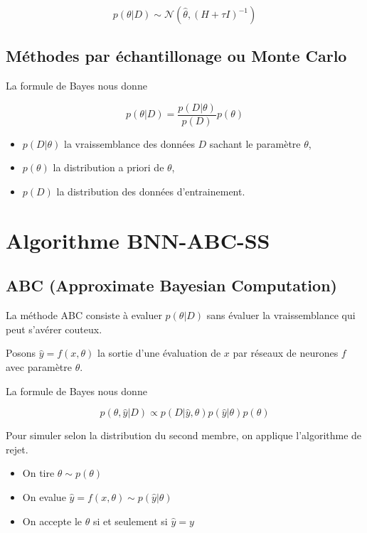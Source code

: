 \documentclass[french,12pt]{article}
\begin{document}
$$p(\theta | D) \sim \mathcal{N}(\hat{\theta}, (H + \tau I)^{-1})$$

\subsection{Méthodes par échantillonage ou Monte Carlo}

La formule de Bayes nous donne

$$p(\theta | D) = \frac{p(D | \theta) }{p(D)}p(\theta)$$

\begin{itemize}
    \item $p(D | \theta)$ la vraissemblance des données $D$ sachant le paramètre $\theta$,
    \item $p(\theta)$ la distribution a priori de $\theta$,
    \item $p(D)$ la distribution des données d'entrainement.
\end{itemize}

\pagebreak

\section{Algorithme BNN-ABC-SS}

\subsection{ABC (Approximate Bayesian Computation)}

La méthode ABC consiste à evaluer $p(\theta | D)$ sans évaluer
la vraissemblance qui peut s'avérer couteux.

Posons $\hat{y} = f(x, \theta)$ la sortie d'une évaluation de $x$ par
réseaux de neurones $f$ avec paramètre $\theta$.

La formule de Bayes nous donne

$$ p(\theta, \hat{y} | D) \propto p(D | \hat{y}, \theta) p(\hat{y} | \theta)
    p(\theta)$$

Pour simuler selon la distribution du second membre, on applique
l'algorithme de rejet.

\begin{itemize}
    \item On tire $\theta \sim p(\theta)$
    \item On evalue $\hat{y} = f(x , \theta) \sim p(\hat{y} | \theta)$
    \item On accepte le $\theta$ si et seulement si $\hat{y} = y$
\end{itemize}
\end{document}
